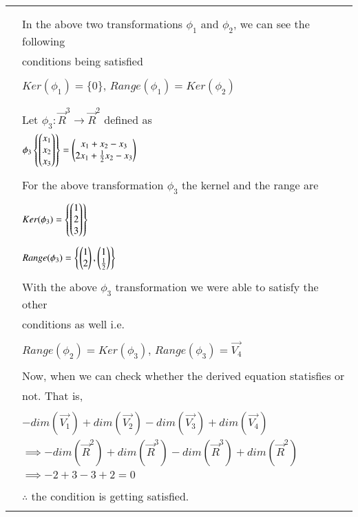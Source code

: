 \documentclass[journal,12pt]{IEEEtran}
\begin{document}
\begin{longtable}{|l|l|}
		& \\
		& \\
		& In the above two transformations $\phi_1$ and $\phi_2$, we can see the following \\
		& conditions being satisfied \\
		& \\
		& \qquad \qquad \qquad $Ker(\phi_1) = \{0\}$, $Range(\phi_1) = Ker(\phi_2)$ \\
		& \\
		& \\
		& Let $\phi_3 : \vec{R}^{3} \rightarrow \vec{R}^{2}$ defined as \\ 
		& \qquad \qquad \qquad $\phi_3 \left\{ \begin{pmatrix}x_1 \\ x_2 \\ x_3\end{pmatrix}\right\} = \begin{pmatrix}x_1 + x_2 - x_3 \\ 2x_1 + \frac{1}{2}x_2 - x_3\end{pmatrix}$ \qquad \qquad \\
		& \\
		& For the above transformation $\phi_3$ the kernel and the range are \\
		& \\
		& \qquad \qquad $Ker(\phi_3) = \left\{\begin{pmatrix}1 \\ 2 \\ 3\end{pmatrix}\right\}$ \\
		& \\
		& \qquad \qquad $Range(\phi_3) = \left\{\begin{pmatrix}1 \\ 2\end{pmatrix}, \begin{pmatrix}1 \\ \frac{1}{2}\end{pmatrix}\right\}$ \\
		& \\
		& With the above $\phi_3$ transformation we were able to satisfy the other \\
		& conditions as well i.e.\\
		& \\
		& \qquad \qquad \qquad  $Range(\phi_2) = Ker(\phi_3)$, $Range(\phi_3) = \vec{V_4}$\\
		&\\
		& Now, when we can check whether the derived equation statisfies or \\
		& not. That is, \\
		& \\
		& \qquad \qquad \qquad $- dim(\vec{V_1}) + dim(\vec{V_2}) - dim(\vec{V_3}) + dim(\vec{V_4}) $ \\
		& \qquad \qquad $\implies - dim(\vec{R}^{2}) + dim(\vec{R}^{3}) - dim(\vec{R}^{3}) + dim(\vec{R}^{2}) $ \\
		& \qquad \qquad $\implies - 2 + 3 - 3 + 2  = 0$ \\
		& \\
		& $\therefore$ the condition is getting satisfied.\\
		& \\
		\hline
	\end{longtable}
		
\end{document}
